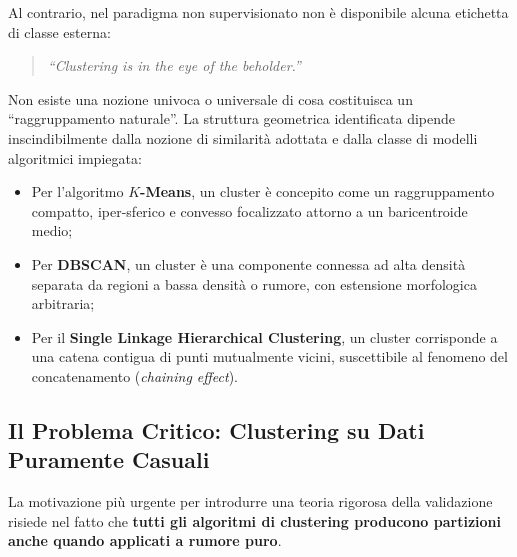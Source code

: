 Al contrario, nel paradigma non supervisionato non è disponibile alcuna etichetta di classe esterna:
\begin{quote}
\textit{``Clustering is in the eye of the beholder.''}
\end{quote}
Non esiste una nozione univoca o universale di cosa costituisca un ``raggruppamento naturale''. La struttura geometrica identificata dipende inscindibilmente dalla nozione di similarità adottata e dalla classe di modelli algoritmici impiegata:
\begin{itemize}[noitemsep]
    \item Per l'algoritmo \textbf{$K$-Means}, un cluster è concepito come un raggruppamento compatto, iper-sferico e convesso focalizzato attorno a un baricentroide medio;
    \item Per \textbf{DBSCAN}, un cluster è una componente connessa ad alta densità separata da regioni a bassa densità o rumore, con estensione morfologica arbitraria;
    \item Per il \textbf{Single Linkage Hierarchical Clustering}, un cluster corrisponde a una catena contigua di punti mutualmente vicini, suscettibile al fenomeno del concatenamento (\textit{chaining effect}).
\end{itemize}

\FloatBarrier
\subsection{Il Problema Critico: Clustering su Dati Puramente Casuali}
La motivazione più urgente per introdurre una teoria rigorosa della validazione risiede nel fatto che \textbf{tutti gli algoritmi di clustering producono partizioni anche quando applicati a rumore puro}.

